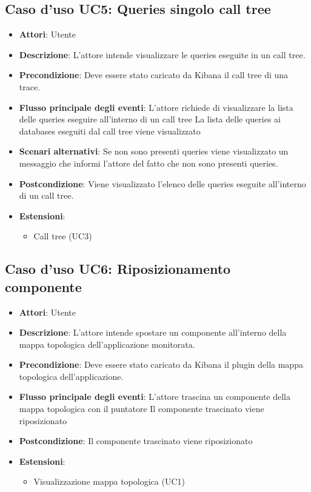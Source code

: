 \subsection{Caso d'uso UC5: Queries singolo call tree}
\begin{itemize}
\item \textbf{Attori}: Utente
\item \textbf{Descrizione}: L'attore intende visualizzare le queries eseguite in un call tree.
\item \textbf{Precondizione}: Deve essere stato caricato da Kibana il call tree di una trace.
\item \textbf{Flusso principale degli eventi}: L'attore richiede di visualizzare la lista delle queries eseguire all'interno di un call tree
La lista delle queries ai databases eseguiti dal call tree viene visualizzato
\item \textbf{Scenari alternativi}: Se non sono presenti queries viene visualizzato un messaggio che informi l'attore del fatto che non sono presenti queries.
\item \textbf{Postcondizione}: Viene visualizzato l'elenco delle queries eseguite all'interno di un call tree.
\item \textbf{Estensioni}:
\begin{itemize}
\item Call tree (UC3)
\end{itemize}
\end{itemize}
\subsection{Caso d'uso UC6: Riposizionamento componente}
\begin{itemize}
\item \textbf{Attori}: Utente
\item \textbf{Descrizione}: L'attore intende spostare un componente all'interno della mappa topologica dell'applicazione monitorata.
\item \textbf{Precondizione}: Deve essere stato caricato da Kibana il plugin della mappa topologica dell'applicazione.
\item \textbf{Flusso principale degli eventi}: L'attore trascina un componente della mappa topologica con il puntatore
Il componente trascinato viene riposizionato
\item \textbf{Postcondizione}: Il componente trascinato viene riposizionato
\item \textbf{Estensioni}:
\begin{itemize}
\item Visualizzazione mappa topologica (UC1)
\end{itemize}
\end{itemize}

